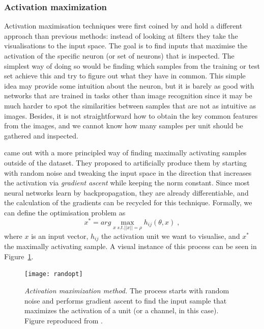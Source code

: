\subsubsection*{Activation maximization} \label{sect:actmax}
Activation maximisation techniques were first coined by \cite{Erhan2009} and hold a different approach than previous methods: instead of looking at filters they take the visualisations to the input space. The goal is to find inputs that maximise the activation of the specific neuron (or set of neurons) that is inspected. The simplest way of doing so would be finding which samples from the training or test set achieve this and try to figure out what they have in common. This simple idea may provide some intuition about the neuron, but it is barely as good with networks that are trained in tasks other than image recognition since it may be much harder to spot the similarities between samples that are not as intuitive as images. Besides, it is not straightforward how to obtain the key common features from the images, and we cannot know how many samples per unit should be gathered and inspected.

\cite{Erhan2009} came out with a more principled way of finding maximally activating samples outside of the dataset. They proposed to artificially produce them by starting with random noise and tweaking the input space in the direction that increases the activation via \textit{gradient ascent} while keeping the norm constant. Since most neural networks learn by backpropagation, they are already differentiable, and the calculation of the gradients can be recycled for this technique. Formally, we can define the optimisation problem as
\begin{equation}
x^* = arg \max\limits_{x \; s.t. ||x||=\rho} h_{ij}(\theta,x) \; ,
\label{eq:opt}
\end{equation}
where $x$ is an input vector, $h_{ij}$ the activation unit we want to visualise, and $x^*$ the maximally activating sample. A visual instance of this process can be seen in Figure~\ref{fig:randopt}.

\begin{figure}
	\centering
	\texttt{[image: randopt]}
	\caption{\textit{Activation maximization method.} The process starts with random noise and performs gradient ascent to find the input sample that maximizes the activation of a unit (or a channel, in this case). Figure reproduced from \cite{Olah2017}.}
	\label{fig:randopt}
\end{figure}

